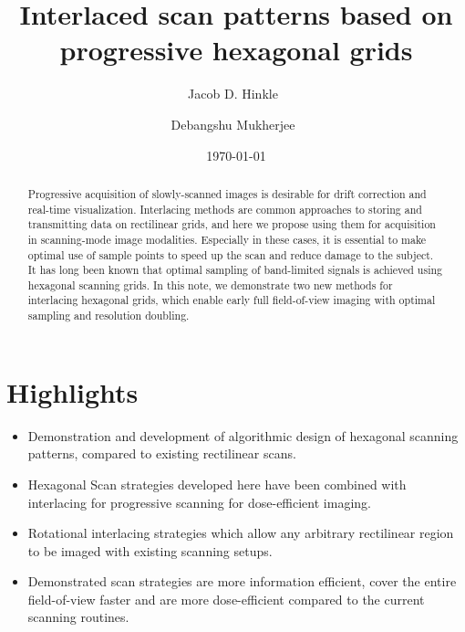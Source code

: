 \documentclass[aip, amsmath, amssymb, nobibnotes, nofootinbib, citeautoscript, reprint, superscriptaddress]{revtex4-2}
\begin{document}
	\title{Interlaced scan patterns based on progressive hexagonal grids}
	\author{Jacob D. Hinkle\ }
    \author{Debangshu Mukherjee\ }
    
    \date{\today}
	
	\begin{abstract}
        Progressive acquisition of slowly-scanned images is desirable for drift correction and real-time visualization. 
        Interlacing methods are common approaches to storing and transmitting data on rectilinear grids, and here we propose using them for acquisition in scanning-mode image modalities. 
        Especially in these cases, it is essential to make optimal use of sample points to speed up the scan and reduce damage to the subject. 
        It has long been known that optimal sampling of band-limited signals is achieved using hexagonal scanning grids. 
        In this note, we demonstrate two new methods for interlacing hexagonal grids, which enable early full field-of-view imaging with optimal sampling and resolution doubling.
	\end{abstract}
    
    \maketitle
    
    \section*{Highlights}
    \begin{itemize}
    \vspace{-10pt}
    \setlength\itemsep{0em}
    \item Demonstration and development of algorithmic design of hexagonal scanning patterns, compared to existing rectilinear scans.
    \item Hexagonal Scan strategies developed here have been combined with interlacing for progressive scanning for dose-efficient imaging.
    \item Rotational interlacing strategies which allow any arbitrary rectilinear region to be imaged with existing scanning setups. 
    \item Demonstrated scan strategies are more information efficient,  cover the entire field-of-view faster and are more dose-efficient compared to the current scanning routines.
    \end{itemize}
	
\end{document}
